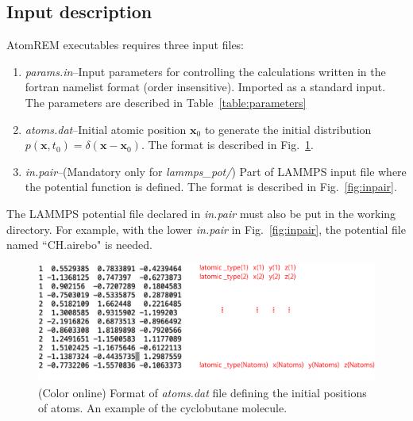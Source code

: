 \documentclass[preprint,12pt]{elsarticle}
\begin{document}
\subsection{Input description}
AtomREM executables requires three input files:
\begin{enumerate}
\item
{\it params.in}--Input parameters for controlling the calculations written in the fortran namelist format (order insensitive). Imported as a standard input. The parameters are described in Table~\ref{table:parameters}

\item
{\it atoms.dat}--Initial atomic position ${\bm x}_{0}$ to generate the initial distribution $p({\bm x}, t_{0})=\delta({\bm x}-{\bm x}_{0})$. The format is described in Fig.~\ref{fig:atomsdat}.

\item
{\it in.pair}--(Mandatory only for {\it lammps\_pot/}) Part of LAMMPS input file where the potential function is defined. The format is described in Fig.~\ref{fig:inpair}.
\end{enumerate}
The LAMMPS potential file declared in {\it in.pair} must also be put in the working directory. For example, with the lower {\it in.pair} in Fig.~\ref{fig:inpair}, the potential file named ``CH.airebo" is needed.

\begin{figure}[!t]
 \begin{center}
 \includegraphics[scale=0.5]{atoms_dat.pdf}
  \caption{(Color online)  Format of {\it atoms.dat} file defining the initial positions of atoms. An example of the cyclobutane molecule.}
  \label{fig:atomsdat}
 \end{center}
\end{figure}
\end{document}
